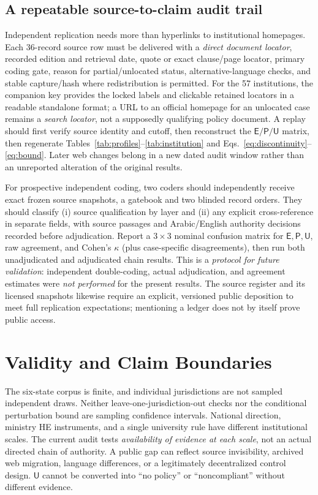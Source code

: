 \documentclass[conference,letterpaper]{IEEEtran}
\newcommand{\stE}{\textsf{E}}
\newcommand{\stP}{\textsf{P}}
\newcommand{\stU}{\textsf{U}}
\begin{document}
\subsection{A repeatable source-to-claim audit trail}
Independent replication needs more than hyperlinks to institutional homepages. Each 36-record source row must be delivered with a \emph{direct document locator}, recorded edition and retrieval date, quote or exact clause/page locator, primary coding gate, reason for partial/unlocated status, alternative-language checks, and stable capture/hash where redistribution is permitted. For the 57 institutions, the companion key provides the locked labels and clickable retained locators in a readable standalone format; a URL to an official homepage for an unlocated case remains a \emph{search locator}, not a supposedly qualifying policy document. A replay should first verify source identity and cutoff, then reconstruct the $\stE/\stP/\stU$ matrix, then regenerate Tables~\ref{tab:profiles}--\ref{tab:institution} and Eqs.~\eqref{eq:discontinuity}--\eqref{eq:bound}. Later web changes belong in a new dated audit window rather than an unreported alteration of the original results.

For prospective independent coding, two coders should independently receive exact frozen source snapshots, a gatebook and two blinded record orders. They should classify (i) source qualification by layer and (ii) any explicit cross-reference in separate fields, with source passages and Arabic/English authority decisions recorded before adjudication. Report a $3\!\times\!3$ nominal confusion matrix for $\stE,\stP,\stU$, raw agreement, and Cohen's $\kappa$ (plus case-specific disagreements), then run both unadjudicated and adjudicated chain results. This is a \emph{protocol for future validation}: independent double-coding, actual adjudication, and agreement estimates were \emph{not performed} for the present results. The source register and its licensed snapshots likewise require an explicit, versioned public deposition to meet full replication expectations; mentioning a ledger does not by itself prove public access.


\section{Validity and Claim Boundaries}
The six-state corpus is finite, and individual jurisdictions are not sampled independent draws. Neither leave-one-jurisdiction-out checks nor the conditional perturbation bound are sampling confidence intervals. National direction, ministry HE instruments, and a single university rule have different institutional scales. The current audit tests \emph{availability of evidence at each scale}, not an actual directed chain of authority. A public gap can reflect source invisibility, archived web migration, language differences, or a legitimately decentralized control design. $\stU$ cannot be converted into ``no policy'' or ``noncompliant'' without different evidence.
\end{document}
